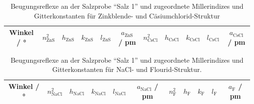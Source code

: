 \begin{table}[H]
  \centering
  \caption{Beugungsreflexe an der Salzprobe \enquote{Salz 1} und zugeordnete Millerindizes und Gitterkonstanten
  für Zinkblende- und Cäsiumchlorid-Struktur}
  \label{Tab:Salza}
  \begin{tabular}{c || c c c c c|c c c c c}
    \toprule
    Winkel / ° &
    $n_{\text{ZnS}}^{2}$ &
    $h_{\text{ZnS}}$ &
    $k_{\text{ZnS}}$ &
    $l_{\text{ZnS}}$ &
    $a_{\text{ZnS}}$ / pm &
    $n_{\text{CsCl}}^{2}$ &
    $h_{\text{CsCl}}$ &
    $k_{\text{CsCl}}$ &
    $l_{\text{CsCl}}$ &
    $a_{\text{CsCl}}$ / pm \\
    \midrule
    
    \bottomrule
  \end{tabular}
\end{table}

\begin{table}[H]
  \centering
  \caption{Beugungsreflexe an der Salzprobe \enquote{Salz 1} und zugeordnete Millerindizes und Gitterkonstanten
  für NaCl- und Flourid-Struktur.}
  \label{Tab:Salzb}
  \begin{tabular}{c || c c c c c|c c c c c}
    \toprule
    Winkel / ° &
    $n_{\text{NaCl}}^{2}$ &
    $h_{\text{NaCl}}$ &
    $k_{\text{NaCl}}$ &
    $l_{\text{NaCl}}$ &
    $a_{\text{NaCl}}$ / pm &
    $n_{\text{F}}^{2}$ &
    $h_{\text{F}}$ &
    $k_{\text{F}}$ &
    $l_{\text{F}}$ &
    $a_{\text{F}}$ / pm \\
    \midrule
    
    \bottomrule
  \end{tabular}
\end{table}

